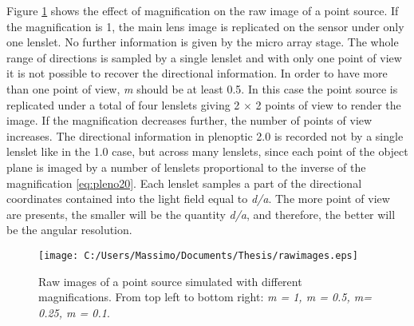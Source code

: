   Figure \ref{fig:rawpleno201} shows the effect of magnification on the raw image of a point source. If the magnification is 1, the main lens image is replicated on the sensor under only one lenslet. No further information is given by the micro array stage. The whole range of directions is sampled by a single lenslet and with only one point of view it is not possible to recover the directional information. In order to have more than one point of view, \textit{m} should be at least 0.5. In this case the point source is replicated under a total of four lenslets giving 2 $\times$ 2 points of view to render the image. If the magnification decreases further, the number of points of view increases. The directional information in plenoptic 2.0 is recorded not by a single lenslet like in the 1.0 case, but across many lenslets, since each point of the object plane is imaged by a number of lenslets proportional to the inverse of the magnification \ref{eq:pleno20}. Each lenslet samples a part of the directional coordinates contained into the light field equal to \textit{d/a}. The more point of view are presents, the smaller will be the quantity \textit{d/a}, and therefore, the better will be the angular resolution. \cite{lumsdaine2009focused}
   \begin{figure}[H]
  	\centering
  	\texttt{[image: C:/Users/Massimo/Documents/Thesis/rawimages.eps]}
  	\caption{\label{fig:rawpleno201}Raw images of a point source simulated with different magnifications. From top left to bottom right: \textit{m = 1, m = 0.5, m= 0.25, m = 0.1}. }
  \end{figure}
  \newpage
